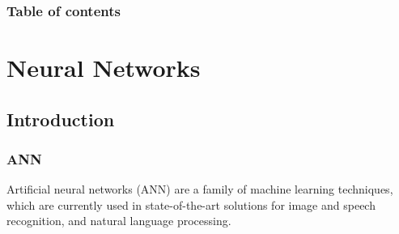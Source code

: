 \documentclass[bigger]{beamer}
\begin{document}
\begin{frame}
\frametitle{Table of contents}
\begin{multicols}{2}
  \tableofcontents
\end{multicols}
\end{frame}

\section{Neural Networks}
\subsection{Introduction}
\begin{frame}
\frametitle{ANN} 
  \justifying
Artificial neural networks (ANN) are a family of machine learning techniques, which are currently used in state-of-the-art solutions for image and speech recognition, and natural language processing.


\end{frame}
\end{document}
